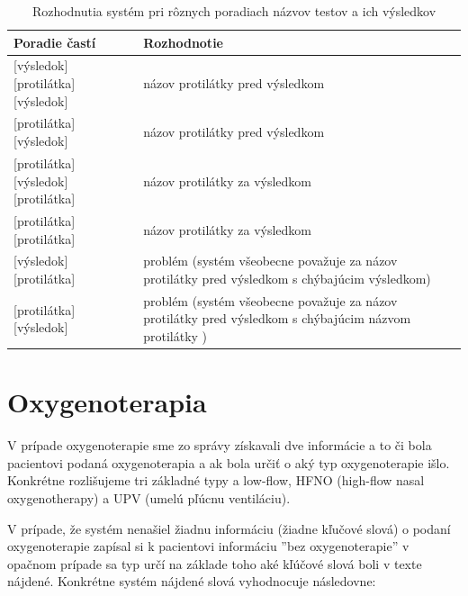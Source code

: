 \begin{table}[]
	\caption[Rozhodia systému pri testoch]{Rozhodnutia systém pri rôznych poradiach názvov testov a ich výsledkov}
	\label{tab:proti}
	\begin{tabular}{|p{8cm}|p{6.7cm}|}
		\hline
		\textbf{Poradie častí}                          & \textbf{Rozhodnotie}                                                                                             \\ \hline
		[protilátka] [výsledok] [protilátka] [výsledok] & názov protilátky pred výsledkom                                                                        \\ \hline
		[protilátka] [protilátka] [výsledok]            & názov protilátky pred výsledkom                                                                        \\ \hline
		[výsledok] [protilátka] [výsledok] [protilátka] & názov protilátky za výsledkom                                                                          \\ \hline
		[výsledok] [protilátka] [protilátka]            & názov protilátky za výsledkom                                                                          \\ \hline
		[protilátka] [výsledok] [protilátka]            & problém (systém všeobecne považuje za názov protilátky pred výsledkom s chýbajúcim výsledkom)          \\ \hline
		[výsledok] [protilátka] [výsledok]              & problém (systém všeobecne považuje za názov protilátky pred výsledkom s chýbajúcim názvom protilátky ) \\ \hline
	\end{tabular}
\end{table}
 
\section{Oxygenoterapia}

V prípade oxygenoterapie sme zo správy získavali dve informácie a to či bola pacientovi podaná oxygenoterapia a ak bola určiť o aký typ oxygenoterapie išlo. Konkrétne rozlišujeme tri základné typy a low-flow, HFNO (high-flow nasal oxygenotherapy) a UPV (umelú pľúcnu ventiláciu). 

V prípade, že systém nenašiel žiadnu informáciu (žiadne kľučové slová) o podaní oxygenoterapie zapísal si k pacientovi informáciu ''bez oxygenoterapie'' v opačnom prípade sa typ určí na základe toho aké kľúčové slová boli v texte nájdené. Konkrétne systém nájdené slová vyhodnocuje následovne:

